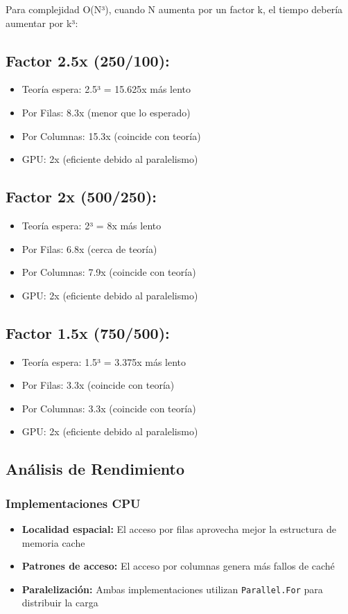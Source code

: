 \documentclass[11pt]{article}
\begin{document}
Para complejidad O(N³), cuando N aumenta por un factor k, el tiempo debería aumentar por k³:

\subsection{Factor 2.5x (250/100):}
\begin{itemize}
    \item Teoría espera: 2.5³ = 15.625x más lento
    \item Por Filas: 8.3x (menor que lo esperado)
    \item Por Columnas: 15.3x (coincide con teoría)
    \item GPU: 2x (eficiente debido al paralelismo)
\end{itemize}

\subsection{Factor 2x (500/250):}
\begin{itemize}
    \item Teoría espera: 2³ = 8x más lento
    \item Por Filas: 6.8x (cerca de teoría)
    \item Por Columnas: 7.9x (coincide con teoría)
    \item GPU: 2x (eficiente debido al paralelismo)
\end{itemize}

\subsection{Factor 1.5x (750/500):}
\begin{itemize}
    \item Teoría espera: 1.5³ = 3.375x más lento
    \item Por Filas: 3.3x (coincide con teoría)
    \item Por Columnas: 3.3x (coincide con teoría)
    \item GPU: 2x (eficiente debido al paralelismo)
\end{itemize}

\subsection{Análisis de Rendimiento}
\subsubsection{Implementaciones CPU}
\begin{itemize}
    \item \textbf{Localidad espacial:} El acceso por filas aprovecha mejor la estructura de memoria cache
    \item \textbf{Patrones de acceso:} El acceso por columnas genera más fallos de caché
    \item \textbf{Paralelización:} Ambas implementaciones utilizan \texttt{Parallel.For} para distribuir la carga
\end{itemize}
\end{document}
